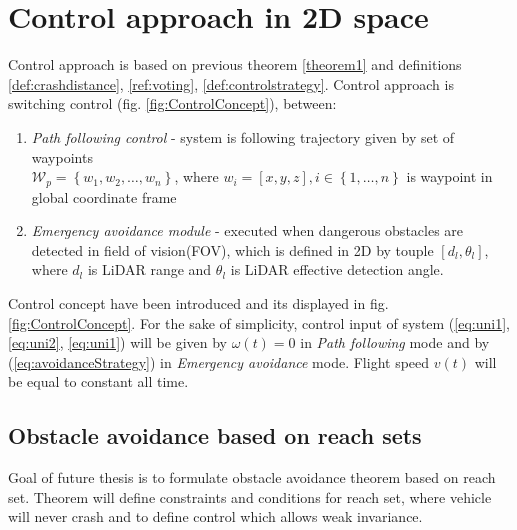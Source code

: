 \chapter{Control approach in 2D space}\label{ch:controlapproach}

Control approach is based on previous theorem \ref{theorem1} and definitions  \ref{def:crashdistance}, \ref{ref:voting}, \ref{def:controlstrategy}. Control approach is switching control (fig. \ref{fig:ControlConcept}), between:
\begin{enumerate}[1.]
    \item\textit{Path following control} - system is following trajectory given by set of waypoints \\$\mathscr{W}_p = \left \{ w_1,w_2,\dots, w_n\right\}$, where $w_i = [x,y,z], i \in \left\{1,\dots,n\right\}$ is waypoint in global coordinate frame
    \item\textit{Emergency avoidance module} - executed when dangerous obstacles are detected in field of vision(FOV), which is defined in 2D by touple $[d_l,\theta_l]$, where $d_l$ is LiDAR range and $\theta_l$ is LiDAR effective detection angle.
\end{enumerate}


Control concept have been introduced and its displayed in fig. \ref{fig:ControlConcept}. For the sake of simplicity, control input of system (\ref{eq:uni1}, \ref{eq:uni2}, \ref{eq:uni1}) will be given by $\omega(t) = 0$ in \textit{Path following} mode and by (\ref{eq:avoidanceStrategy})  in \textit{Emergency avoidance} mode. Flight speed $v(t)$ will be equal to constant all time.

\section{Obstacle avoidance based on reach sets}\label{sec:obstacleavoidancetheorem}
Goal of future thesis is to formulate obstacle avoidance theorem based on reach set. Theorem will define constraints and conditions for reach set, where vehicle will never crash and to define control which allows weak invariance.

